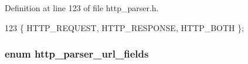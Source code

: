 Definition at line 123 of file http\+\_\+parser.\+h.


\begin{DoxyCode}
123 \{ HTTP_REQUEST, HTTP_RESPONSE, HTTP_BOTH \};
\end{DoxyCode}
\subsubsection[{http\+\_\+parser\+\_\+url\+\_\+fields}]{\setlength{\rightskip}{0pt plus 5cm}enum {\bf http\+\_\+parser\+\_\+url\+\_\+fields}}\label{http__parser_8h_a9ca1f91c2958091e2ac9e9b2f903d4eb}

